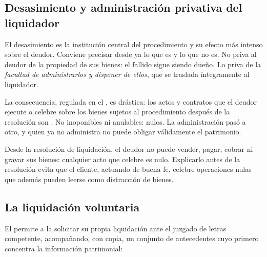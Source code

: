 \subsection{Desasimiento y administración privativa del liquidador}

El desasimiento es la institución central del procedimiento y su efecto más intenso sobre
el deudor. Conviene precisar desde ya lo que es y lo que no es. No priva al deudor de la
propiedad de sus bienes: el fallido sigue siendo dueño. Lo priva de la \emph{facultad de
administrarlos y disponer de ellos}, que se traslada íntegramente al liquidador.

La consecuencia, regulada en el , es drástica: los actos y contratos que el deudor
ejecute o celebre sobre los bienes sujetos al procedimiento después de la resolución son
. No inoponibles ni anulables: nulos. La administración pasó a otro, y quien
ya no administra no puede obligar válidamente el patrimonio.

\begin{foco}
Desde la resolución de liquidación, el deudor no puede vender, pagar, cobrar ni gravar sus
bienes: cualquier acto que celebre es nulo. Explicarlo antes de la resolución evita que el
cliente, actuando de buena fe, celebre operaciones nulas que además pueden leerse como
distracción de bienes.
\end{foco}

\bloqueNormativo

\subsection{La liquidación voluntaria}

El  permite a la \empresadeudora{} solicitar su propia liquidación ante el juzgado
de letras competente, acompañando, con copia, un conjunto de antecedentes cuyo primero
concentra la información patrimonial:

